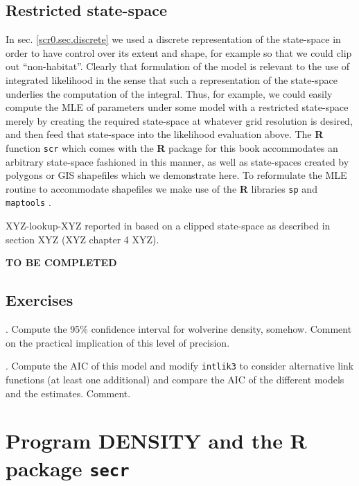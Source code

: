 \subsection{Restricted state-space}

In sec. \ref{scr0.sec.discrete} 
 we used a discrete representation of
the state-space in order to have control over its extent and shape,
for example so that we could clip out ``non-habitat''. Clearly that
formulation of the model is relevant to the use of integrated
likelihood in the sense that such a representation of the state-space
underlies the computation of the integral. Thus, for example, we could
easily compute the MLE of parameters under some model with a
restricted state-space merely by creating the required state-space at
whatever grid resolution is desired, and then feed that state-space
into the likelihood evaluation above. The {\bf R} function \mbox{\tt scr}
which comes with the {\bf R} package for this book accommodates an
arbitrary state-space fashioned in this manner, as well as
state-spaces created by polygons or GIS shapefiles  which we
demonstrate here. To reformulate the MLE routine to accommodate
shapefiles we make use of the {\bf R} libraries \mbox{\tt sp}  and
\mbox{\tt maptools}  . 









XYZ-lookup-XYZ reported in
\citet{royle_etal:2011jwm} based on a clipped state-space as described
in section XYZ (XYZ chapter 4 XYZ).

{\bf TO BE COMPLETED}


\subsection{
Exercises
}

{.	Compute the 95\% confidence interval for wolverine density,
somehow. Comment on the practical implication of this level of precision.
}

{.	Compute the AIC of this model and modify \mbox{\tt intlik3}
 to consider alternative link functions (at least one additional) and
 compare the  AIC of the different models and the estimates. Comment. 
}

\section{Program DENSITY and the R package \mbox{\tt secr} }
\label{mle.sec.secr}


